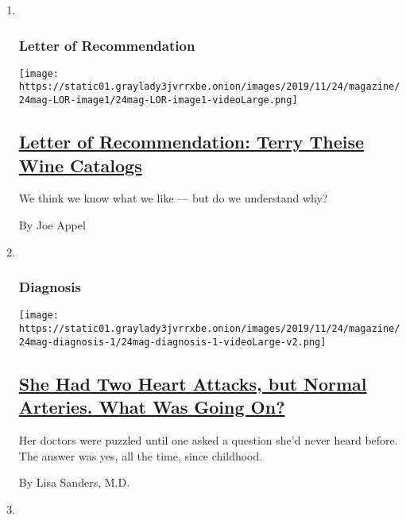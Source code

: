 \begin{enumerate}
\def\labelenumi{\arabic{enumi}.}
\item ~
  \hypertarget{letter-of-recommendation}{%
  \subsubsection{Letter of
  Recommendation}\label{letter-of-recommendation}}

  \texttt{[image: https://static01.graylady3jvrrxbe.onion/images/2019/11/24/magazine/24mag-LOR-image1/24mag-LOR-image1-videoLarge.png]}

  \hypertarget{letter-of-recommendation-terry-theise-wine-catalogs}{%
  \subsection{\texorpdfstring{\href{/2019/11/19/magazine/letter-of-recommendation-terry-theise-wine-catalogs.html}{Letter
  of Recommendation: Terry Theise Wine
  Catalogs}}{Letter of Recommendation: Terry Theise Wine Catalogs}}\label{letter-of-recommendation-terry-theise-wine-catalogs}}

  We think we know what we like --- but do we understand why?

  By Joe Appel
\item ~
  \hypertarget{diagnosis}{%
  \subsubsection{Diagnosis}\label{diagnosis}}

  \texttt{[image: https://static01.graylady3jvrrxbe.onion/images/2019/11/24/magazine/24mag-diagnosis-1/24mag-diagnosis-1-videoLarge-v2.png]}

  \hypertarget{she-had-two-heart-attacks-but-normal-arteries-what-was-going-on}{%
  \subsection{\texorpdfstring{\href{/2019/11/20/magazine/heart-attack-diagnosis.html}{She
  Had Two Heart Attacks, but Normal Arteries. What Was Going
  On?}}{She Had Two Heart Attacks, but Normal Arteries. What Was Going On?}}\label{she-had-two-heart-attacks-but-normal-arteries-what-was-going-on}}

  Her doctors were puzzled until one asked a question she'd never heard
  before. The answer was yes, all the time, since childhood.

  By Lisa Sanders, M.D.
\item ~
  \hypertarget{the-ethicist}{%
}
\end{enumerate}
